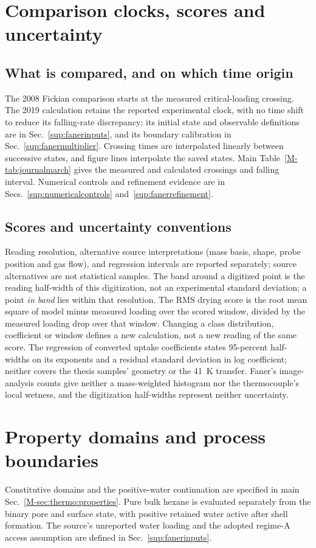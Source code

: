 \section{Comparison clocks, scores and uncertainty}
\label{sup:protocol}\label{sup:protocol:availability}
\subsection{What is compared, and on which time origin}
The 2008 Fickian comparison starts at the measured critical-loading
crossing. The 2019 calculation retains the reported experimental clock,
with no time shift to reduce its falling-rate discrepancy; its initial
state and observable definitions are in Sec.~\ref{sup:fanerinputs}, and
its boundary calibration in Sec.~\ref{sup:fanermultiplier}. Crossing times
are interpolated linearly between successive states, and figure lines
interpolate the saved states. Main Table~\ref*{M-tab:journalmarch} gives
the measured and calculated crossings and falling interval. Numerical
controls and refinement evidence are in Secs.~\ref{sup:numericalcontrols}
and~\ref{sup:fanerrefinement}.

\subsection{Scores and uncertainty conventions}
Reading resolution, alternative source interpretations (mass basis, shape,
probe position and gas flow), and regression intervals are reported
separately; source alternatives are not statistical samples.
The band around a digitized point is the reading half-width of this digitization, not an experimental standard deviation; a point \emph{in band} lies within that resolution. The RMS drying score is the root mean square of model minus measured loading over the scored window, divided by the measured loading drop over that window. Changing a class distribution, coefficient or window defines a new calculation, not a new reading of the same score. The regression of converted uptake coefficients states 95-percent half-widths on its exponents and a residual standard deviation in log coefficient; neither covers the thesis samples' geometry or the \SI{41}{\kelvin} transfer. Faner's image-analysis counts give neither a mass-weighted histogram nor the thermocouple's local wetness, and the digitization half-widths represent neither uncertainty.

\section{Property domains and process boundaries}
\label{sup:propertyledger}
Constitutive domains and the positive-water continuation are specified in
main Sec.~\ref*{M-sec:thermo:properties}. Pure bulk hexane is evaluated
separately from the binary pore and surface state, with positive retained
water active after shell formation. The source's unreported water loading
and the adopted regime-A access assumption are defined in
Sec.~\ref{sup:fanerinputs}.
